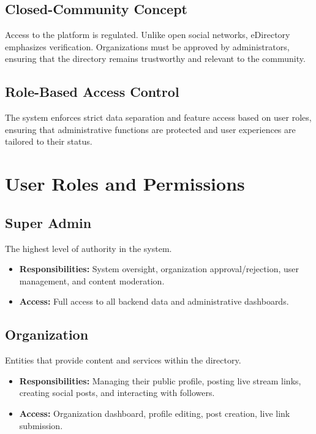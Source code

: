 \documentclass[12pt, a4paper]{report}
\begin{document}
\section{Closed-Community Concept}
Access to the platform is regulated. Unlike open social networks, eDirectory emphasizes verification. Organizations must be approved by administrators, ensuring that the directory remains trustworthy and relevant to the community.

\section{Role-Based Access Control}
The system enforces strict data separation and feature access based on user roles, ensuring that administrative functions are protected and user experiences are tailored to their status.

\chapter{User Roles and Permissions}

\section{Super Admin}
The highest level of authority in the system.
\begin{itemize}
    \item \textbf{Responsibilities:} System oversight, organization approval/rejection, user management, and content moderation.
    \item \textbf{Access:} Full access to all backend data and administrative dashboards.
\end{itemize}

\section{Organization}
Entities that provide content and services within the directory.
\begin{itemize}
    \item \textbf{Responsibilities:} Managing their public profile, posting live stream links, creating social posts, and interacting with followers.
    \item \textbf{Access:} Organization dashboard, profile editing, post creation, live link submission.
\end{itemize}
\end{document}
